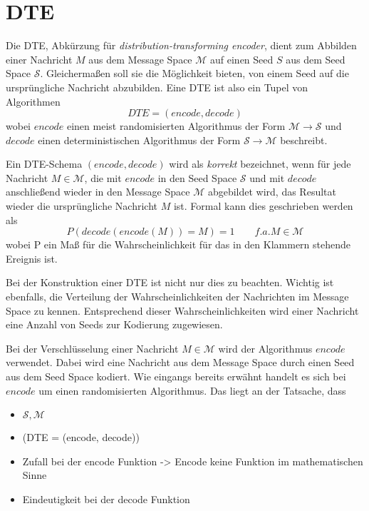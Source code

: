 \section{DTE}
\label{sec:dte}
Die DTE, Abkürzung für \emph{distribution-transforming encoder}, dient zum Abbilden einer Nachricht $M$ aus dem Message Space $\mathcal{M}$ auf einen Seed $S$ aus dem Seed Space $\mathcal{S}$. Gleichermaßen soll sie die Möglichkeit bieten, von einem Seed auf die ursprüngliche Nachricht abzubilden. Eine DTE ist also ein Tupel von Algorithmen
$$DTE = (encode, decode)$$
wobei $encode$ einen meist randomisierten Algorithmus der Form $\mathcal{M} \rightarrow \mathcal{S}$ und $decode$ einen deterministischen Algorithmus der Form $\mathcal{S} \rightarrow \mathcal{M}$ beschreibt.

Ein DTE-Schema $(encode, decode)$ wird als \emph{korrekt} bezeichnet, wenn für jede Nachricht $M \in \mathcal{M}$, die mit $encode$ in den Seed Space $\mathcal{S}$ und mit $decode$ anschließend wieder in den Message Space $\mathcal{M}$ abgebildet wird, das Resultat wieder die ursprüngliche Nachricht $M$  ist. Formal kann dies geschrieben werden als
$$P(decode(encode(M)) = M) = 1 \qquad f.a. M \in \mathcal{M}$$
wobei P ein Maß für die Wahrscheinlichkeit für das in den Klammern stehende Ereignis ist.

Bei der Konstruktion einer DTE ist nicht nur dies zu beachten. Wichtig ist ebenfalls, die Verteilung der Wahrscheinlichkeiten der Nachrichten im Message Space zu kennen. Entsprechend dieser Wahrscheinlichkeiten wird einer Nachricht eine Anzahl von Seeds zur Kodierung zugewiesen.

Bei der Verschlüsselung einer Nachricht $M \in \mathcal{M}$ wird der Algorithmus $encode$ verwendet. Dabei wird eine Nachricht aus dem Message Space durch einen Seed aus dem Seed Space kodiert. Wie eingangs bereits erwähnt handelt es sich bei $encode$ um einen randomisierten Algorithmus. Das liegt an der Tatsache, dass 








\begin{itemize}
\item $\mathcal{S}, \mathcal{M}$
\item (DTE = (encode, decode))
\item Zufall bei der encode Funktion -> Encode keine Funktion im mathematischen Sinne
\item Eindeutigkeit bei der decode Funktion
\end{itemize}

\newpage